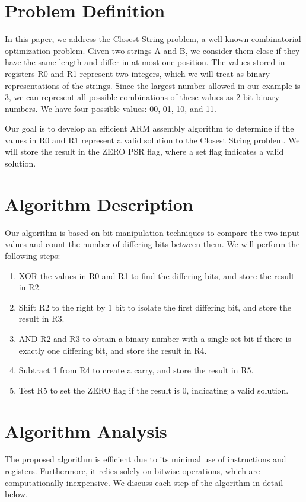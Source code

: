 \section{Problem Definition}
In this paper, we address the Closest String problem, a well-known combinatorial optimization problem. Given two strings A and B, we consider them close if they have the same length and differ in at most one position. The values stored in registers R0 and R1 represent two integers, which we will treat as binary representations of the strings. Since the largest number allowed in our example is 3, we can represent all possible combinations of these values as 2-bit binary numbers. We have four possible values: 00, 01, 10, and 11.

Our goal is to develop an efficient ARM assembly algorithm to determine if the values in R0 and R1 represent a valid solution to the Closest String problem. We will store the result in the ZERO PSR flag, where a set flag indicates a valid solution.

\section{Algorithm Description}
Our algorithm is based on bit manipulation techniques to compare the two input values and count the number of differing bits between them. We will perform the following steps:

\begin{enumerate}
    \item XOR the values in R0 and R1 to find the differing bits, and store the result in R2.
    \item Shift R2 to the right by 1 bit to isolate the first differing bit, and store the result in R3.
    \item AND R2 and R3 to obtain a binary number with a single set bit if there is exactly one differing bit, and store the result in R4.
    \item Subtract 1 from R4 to create a carry, and store the result in R5.
    \item Test R5 to set the ZERO flag if the result is 0, indicating a valid solution.
\end{enumerate}

\section{Algorithm Analysis}
The proposed algorithm is efficient due to its minimal use of instructions and registers. Furthermore, it relies solely on bitwise operations, which are computationally inexpensive. We discuss each step of the algorithm in detail below.

